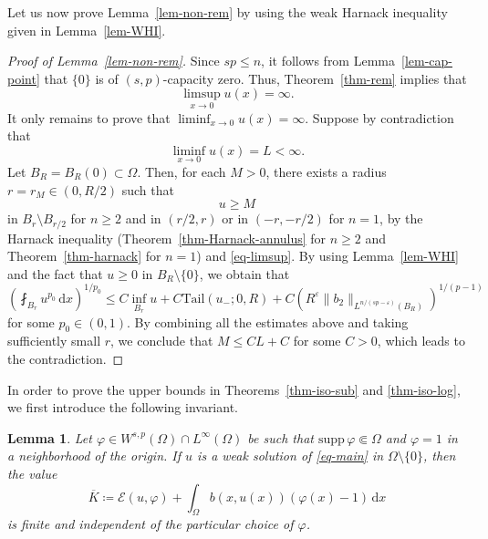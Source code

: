 \documentclass[11pt]{amsart}
\theoremstyle{plain}
\newtheorem{lemma}[theorem]{Lemma}
\theoremstyle{definition}
\numberwithin{equation}{section}
\begin{document}
Let us now prove Lemma~\ref{lem-non-rem} by using the weak Harnack inequality given in Lemma~\ref{lem-WHI}.

\begin{proof}[Proof of Lemma~\ref{lem-non-rem}]
Since $sp \leq n$, it follows from Lemma~\ref{lem-cap-point} that $\{0\}$ is of $(s,p)$-capacity zero. Thus, Theorem~\ref{thm-rem} implies that
\begin{equation}\label{eq-limsup}
	\limsup_{x \to 0}u(x)=\infty.
\end{equation}
It only remains to prove that $\liminf_{x \to 0}u(x)=\infty$. Suppose by contradiction that 
\begin{equation*}
	\liminf_{x \to 0}u(x)=L<\infty.
\end{equation*}
Let $B_R=B_R(0) \subset \Omega$. Then, for each $M>0$, there exists a radius $r=r_M \in (0, R/2)$ such that
\begin{equation*}
u \geq M
\end{equation*}
in $B_r \setminus B_{r/2}$ for $n \geq 2$ and in $(r/2, r)$ or in $(-r, -r/2)$ for $n=1$, by the Harnack inequality (Theorem~\ref{thm-Harnack-annulus} for $n \geq 2$ and Theorem~\ref{thm-harnack} for $n=1$) and \eqref{eq-limsup}. By using Lemma~\ref{lem-WHI} and the fact that $u \geq 0$ in $B_R \setminus \{0\}$, we obtain that
\begin{equation*}
	\left(\fint_{B_{r}} u^{p_0}\,\mathrm{d}x\right)^{1/p_0} \leq C \inf_{B_{r}} u+C\mathrm{Tail}(u_-; 0, R) + C \left( R^\varepsilon \|b_2\|_{L^{n/(sp-\varepsilon)}(B_R)} \right)^{1/(p-1)}
\end{equation*}
for some $p_0 \in (0,1)$. By combining all the estimates above and taking sufficiently small $r$, we conclude that $M \leq CL+C$ for some $C>0$, which leads to the contradiction.
\end{proof}

In order to prove the upper bounds in Theorems~\ref{thm-iso-sub} and \ref{thm-iso-log}, we first introduce the following invariant.

\begin{lemma}\label{lem-const}
Let $\varphi \in W^{s, p}(\Omega) \cap L^\infty(\Omega)$ be such that $\mathrm{supp}\,{\varphi} \Subset \Omega$ and $\varphi= 1$ in a neighborhood of the origin. If $u$ is a weak solution of \eqref{eq-main} in $\Omega \setminus \{0\}$, then the value
\begin{equation}\label{eq-const-Kbar}
\overline{K}\coloneqq \mathcal{E}(u, \varphi)+\int_{\Omega} b(x, u(x))(\varphi(x)-1) \,\mathrm{d}x
\end{equation}
is finite and independent of the particular choice of $\varphi$.
\end{lemma}
\end{document}
